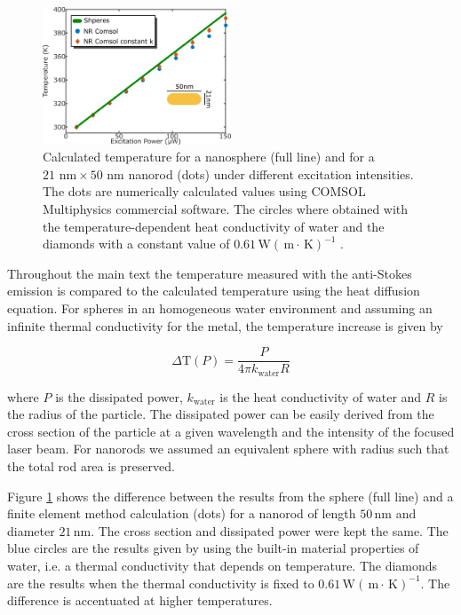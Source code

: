 \documentclass[journal=nalefd,manuscript=letter]{achemso}
\newcommand{\K}{\ensuremath{\,\textrm{K}}}
\newcommand{\nm}{\ensuremath{\,\textrm{nm}}}
\newcommand{\m}{\ensuremath{\,\textrm{m}}}
\newcommand{\W}{\ensuremath{\,\textrm{W}}}
\begin{document}
\begin{figure}[htp] \centering
\includegraphics[width=0.5\textwidth]{Figures/Supplementary/04_Compare_Comsol/04_Compare_Comsol.png}
\caption{Calculated temperature for a nanosphere (full line) and 
for a $21\,\nm\times 50\,\nm$ nanorod (dots) under different excitation intensities. 
The dots are numerically calculated values using COMSOL Multiphysics commercial software. 
The circles where obtained with the temperature-dependent heat conductivity of water 
and the diamonds with a constant value of $0.61 \W(\m\cdot\K)^{-1}$ .}
	\label{fig:Compare-Comsol}
\end{figure}

Throughout the main text the temperature measured with the anti-Stokes emission
is compared to the calculated temperature using the heat diffusion
equation. For spheres in an homogeneous water environment and assuming an infinite
thermal conductivity for the metal, the temperature increase is given by

\begin{equation}
	\Delta \textrm{T}(P) = \frac{P}{4\pi k_{\textrm{water}} R}
\end{equation}

\noindent where $P$ is the dissipated power, $k_{\textrm{water}}$ is the heat
conductivity of water and $R$ is the radius of the particle.\cite{Baffou2013} 
The dissipated power can be
easily derived from the cross section of the particle at a given wavelength and
the intensity of the focused laser beam. For nanorods we assumed an
equivalent sphere with radius such that the total rod area is preserved.

Figure \ref{fig:Compare-Comsol} shows the difference between the results from
the sphere (full line) and a finite element method calculation
(dots) for a nanorod of length $50\nm$ and diameter $21\nm$. The cross section
and dissipated power were kept the same. The blue circles are the results given
by using the built-in material properties of water, i.e. a thermal conductivity
that depends on temperature. The diamonds are the results when the thermal
conductivity is fixed to $0.61 \W(\m\cdot\K)^{-1}$. The difference is
accentuated at higher temperatures.
\end{document}
